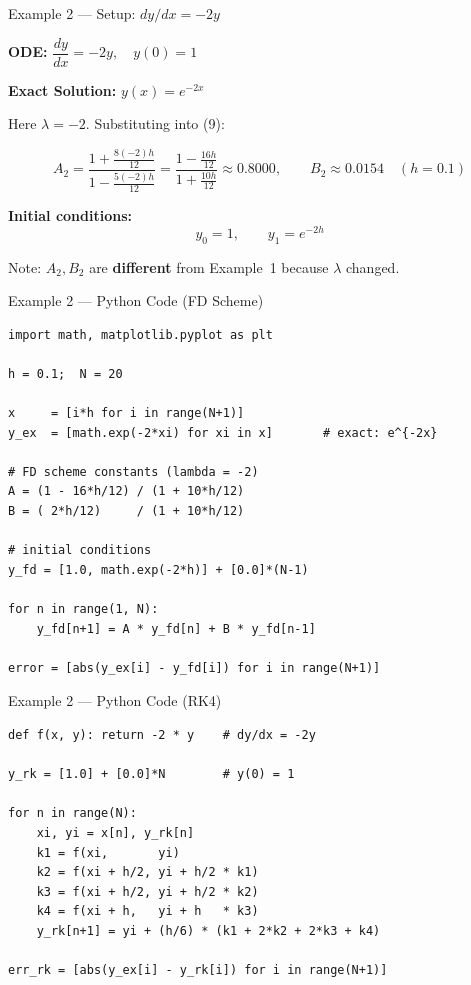 \documentclass{beamer}
\begin{document}
\begin{frame}{Example 2 — Setup: $dy/dx = -2y$}

\textbf{ODE:} $\dfrac{dy}{dx} = -2y, \quad y(0) = 1$

\textbf{Exact Solution:} $y(x) = e^{-2x}$

\vspace{0.3cm}
Here $\lambda = -2$. Substituting into (9):

\begin{equation}
    A_2 = \frac{1 + \tfrac{8(-2)h}{12}}{1 - \tfrac{5(-2)h}{12}}
         = \frac{1 - \tfrac{16h}{12}}{1 + \tfrac{10h}{12}}
    \approx 0.8000, \qquad B_2 \approx 0.0154 \quad (h=0.1)
\end{equation}

\vspace{0.3cm}
\textbf{Initial conditions:}
\[
    y_0 = 1, \qquad y_1 = e^{-2h}
\]

Note: $A_2, B_2$ are \textbf{different} from Example~1 because $\lambda$ changed.

\end{frame}

\begin{frame}[fragile]{Example 2 — Python Code (FD Scheme)}

\begin{lstlisting}[style=pythonstyle]
import math, matplotlib.pyplot as plt

h = 0.1;  N = 20

x     = [i*h for i in range(N+1)]
y_ex  = [math.exp(-2*xi) for xi in x]       # exact: e^{-2x}

# FD scheme constants (lambda = -2)
A = (1 - 16*h/12) / (1 + 10*h/12)
B = ( 2*h/12)     / (1 + 10*h/12)

# initial conditions
y_fd = [1.0, math.exp(-2*h)] + [0.0]*(N-1)

for n in range(1, N):
    y_fd[n+1] = A * y_fd[n] + B * y_fd[n-1]

error = [abs(y_ex[i] - y_fd[i]) for i in range(N+1)]
\end{lstlisting}

\end{frame}

\begin{frame}[fragile]{Example 2 — Python Code (RK4)}

\begin{lstlisting}[style=pythonstyle]
def f(x, y): return -2 * y    # dy/dx = -2y

y_rk = [1.0] + [0.0]*N        # y(0) = 1

for n in range(N):
    xi, yi = x[n], y_rk[n]
    k1 = f(xi,       yi)
    k2 = f(xi + h/2, yi + h/2 * k1)
    k3 = f(xi + h/2, yi + h/2 * k2)
    k4 = f(xi + h,   yi + h   * k3)
    y_rk[n+1] = yi + (h/6) * (k1 + 2*k2 + 2*k3 + k4)

err_rk = [abs(y_ex[i] - y_rk[i]) for i in range(N+1)]
\end{lstlisting}

\end{frame}
\end{document}
